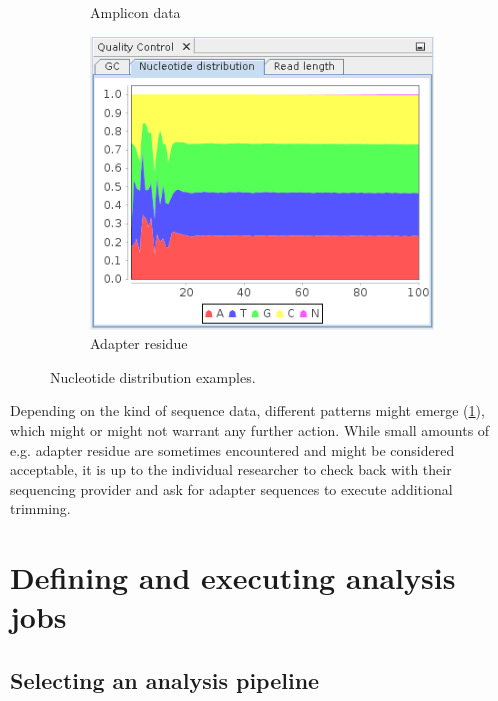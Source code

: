 \begin{figure}[H]
\begin{subfigure}[b]{0.3\textwidth}
                \caption{Amplicon data}
        \end{subfigure}
        \begin{subfigure}[b]{0.3\textwidth}
                \includegraphics[width=\textwidth]{img/mgx/adapterNucl}
                \caption{Adapter residue}
        \end{subfigure}
        \caption{Nucleotide distribution examples.}
  \label{qc4}
\end{figure}

Depending on the kind of sequence data, different patterns might emerge (\ref{qc4}),
which might or might not warrant any further action. While small amounts of e.g. 
adapter residue are sometimes encountered and might be considered acceptable, it is up to the
individual researcher to check back with their sequencing provider and ask for
adapter sequences to execute additional trimming.

\section{Defining and executing analysis jobs}

\subsection{Selecting an analysis pipeline}

